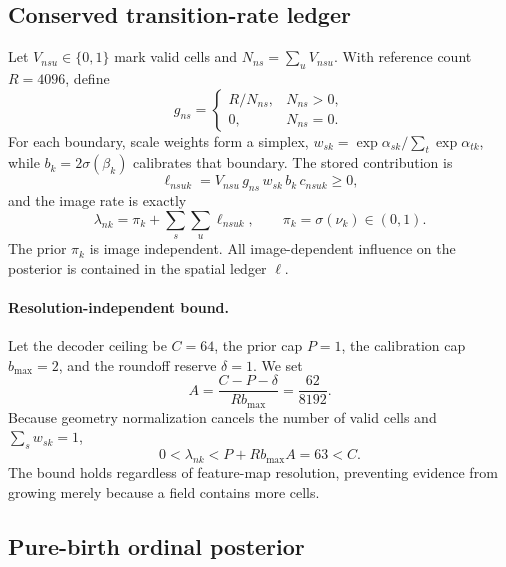\documentclass[10pt,twocolumn,letterpaper]{article}
\begin{document}
\subsection{Conserved transition-rate ledger}
\label{sec:ledger}

Let $V_{nsu}\in\{0,1\}$ mark valid cells and
$N_{ns}=\sum_u V_{nsu}$.  With reference count $R=4096$, define
\begin{equation}
g_{ns}=\begin{cases}R/N_{ns},&N_{ns}>0,\\0,&N_{ns}=0.\end{cases}
\label{eq:geometry}
\end{equation}
For each boundary, scale weights form a simplex,
$w_{sk}=\exp\alpha_{sk}/\sum_t\exp\alpha_{tk}$, while
$b_k=2\sigma(\beta_k)$ calibrates that boundary.  The stored contribution is
\begin{equation}
\ell_{nsuk}=V_{nsu}\,g_{ns}\,w_{sk}\,b_k\,c_{nsuk}\geq0,
\label{eq:local-rate}
\end{equation}
and the image rate is exactly
\begin{equation}
\lambda_{nk}=\pi_k+\sum_s\sum_u\ell_{nsuk},
\qquad \pi_k=\sigma(\nu_k)\in(0,1).
\label{eq:ledger}
\end{equation}
The prior $\pi_k$ is image independent.  All image-dependent influence on the
posterior is contained in the spatial ledger $\ell$.

\paragraph{Resolution-independent bound.}
Let the decoder ceiling be $C=64$, the prior cap $P=1$, the calibration cap
$b_{\max}=2$, and the roundoff reserve $\delta=1$.  We set
\begin{equation}
A=\frac{C-P-\delta}{Rb_{\max}}=\frac{62}{8192}.
\label{eq:atom-cap}
\end{equation}
Because geometry normalization cancels the number of valid cells and
$\sum_s w_{sk}=1$,
\begin{equation}
0<\lambda_{nk}<P+Rb_{\max}A=63<C.
\label{eq:rate-bound}
\end{equation}
The bound holds regardless of feature-map resolution, preventing evidence from
growing merely because a field contains more cells.

\subsection{Pure-birth ordinal posterior}
\label{sec:generator}
\end{document}
